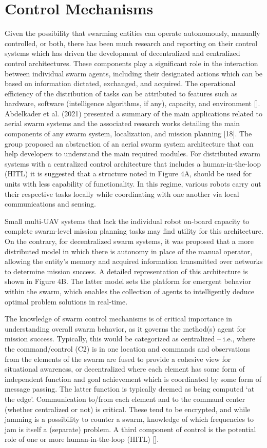 
\section*{Control Mechanisms}
Given the possibility that swarming entities can operate autonomously, manually controlled, or both, there has been much research and reporting on their control systems which has driven the development of decentralized and centralized control architectures. These components play a significant role in the interaction between individual swarm agents, including their designated actions which can be based on information dictated, exchanged, and acquired. The operational efficiency of the distribution of tasks can be attributed to features such as hardware, software (intelligence algorithms, if any), capacity, and environment []. Abdelkader et al. (2021) presented a summary of the main applications related to aerial swarm systems and the associated research works detailing the main components of any swarm system, localization, and mission planning [18]. The group proposed an abstraction of an aerial swarm system architecture that can help developers to understand the main required modules. For distributed swarm systems with a centralized control architecture that includes a human-in-the-loop (HITL) it is suggested that a structure noted in Figure 4A, should be used for units with less capability of functionality. In this regime, various robots carry out their respective tasks locally while coordinating with one another via local communications and sensing.


 Small multi-UAV systems that lack the individual robot on-board capacity to complete swarm-level mission planning tasks may find utility for this architecture. On the contrary, for decentralized swarm systems, it was proposed that a more distributed model in which there is autonomy in place of the manual operator, allowing the entity’s memory and acquired information transmitted over networks to determine mission success. A detailed representation of this architecture is shown in Figure 4B. The latter model sets the platform for emergent behavior within the swarm, which enables the collection of agents to intelligently deduce optimal problem solutions in real-time. 

 
The knowledge of swarm control mechanisms is of critical importance in understanding overall swarm behavior, as it governs the method(s) agent for mission success. Typically, this would be categorized as centralized – i.e., where the command/control (C2) is in one location and commands and observations from the elements of the swarm are fused to provide a cohesive view for situational awareness, or decentralized where each element has some form of independent function and goal achievement which is coordinated by some form of message passing. The latter function is typically deemed as being computed ‘at the edge’. Communication to/from each element and to the command center (whether centralized or not) is critical. These tend to be encrypted, and while jamming is a possibility to counter a swarm, knowledge of which frequencies to jam is itself a (separate) problem. A third component of control is the potential role of one or more human-in-the-loop (HITL) [].

